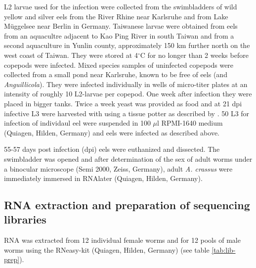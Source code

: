 L2 larvae used for the infection were collected from the swimbladders
of wild yellow and silver eels from the River Rhine near Karlsruhe and
from Lake M\"uggelsee near Berlin in Germany. Taiwanese larvae were
obtained from eels from an aquacultre adjacent to Kao Ping River in
south Taiwan and from a second aquaculture in Yunlin county,
approximately 150 km further north on the west coast of Taiwan. They
were stored at 4$^{\circ}$C for no longer than 2 weeks before copepods
were infected. Mixed species samples of uninfected copepods were
collected from a small pond near Karlsruhe, known to be free of eels
(and \textit{Anguillicola}). They were infected individually in wells
of micro-titer plates at an intensity of roughly 10 L2-larvae per
copepod. One week after infection they were placed in bigger
tanks. Twice a week yeast was provided as food and at 21 dpi infective
L3 were harvested with using a tissue potter as described by
\cite{haenen_improved_1994}. 50 L3 for infection of individaul eel
were suspended in 100 $\mu$l RPMI-1640 medium (Quiagen, Hilden,
Germany) and eels were infected as described above.

55-57 days post infection (dpi) eels were euthanized and dissected.
The swimbladder was opened and after determination of the sex of adult
worms under a binocular microscope (Semi 2000, Zeiss, Germany), adult
\textit{A. crassus} were immediately immersed in RNAlater (Quiagen,
Hilden, Germany).

\subsection{RNA extraction and preparation of sequencing libraries}

RNA was extracted from 12 individual female worms and for 12 pools of
male worms using the RNeasy-kit (Quiagen, Hilden, Germany) (see table
\ref{tab:lib-prep}).

